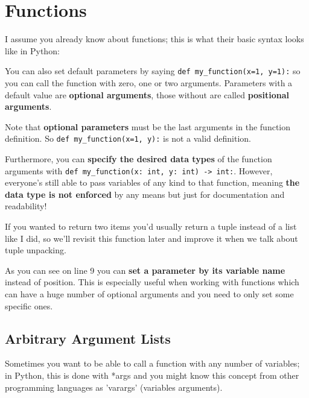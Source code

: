 \section{Functions}

  I assume you already know about functions; this is what their basic syntax looks like in Python:


  You can also set default parameters by saying
  \texttt{def my_function(x=1, y=1):}
  so you can call the function with zero, one or two arguments.
  Parameters with a default value are \textbf{optional arguments}, those without are called
  \textbf{positional arguments}.

  Note that \textbf{optional parameters} must be the last arguments in the function definition.
  So \texttt{def my_function(x=1, y):} is not a valid definition.

  Furthermore, you can \textbf{specify the desired data types} of the function arguments with
  \texttt{def my_function(x: int, y: int) -> int:}.
  However, everyone's still able to pass variables of any kind to that function,
  meaning \textbf{the data type is not enforced} by any means but just
  for documentation and readability!


  If you wanted to return two items you'd usually return a tuple instead of a list like I did,
  so we'll revisit this function later and improve it when we talk about tuple unpacking.

  As you can see on line 9 you can \textbf{set a parameter by its variable name}
  instead of position.
  This is especially useful when working with functions which can have a huge number of optional
  arguments and you need to only set some specific ones.
  
  \subsection{Arbitrary Argument Lists}

    Sometimes you want to be able to call a function with any number of variables;
    in Python, this is done with *args and you might know this concept from other programming
    languages as 'varargs' (variables arguments).

